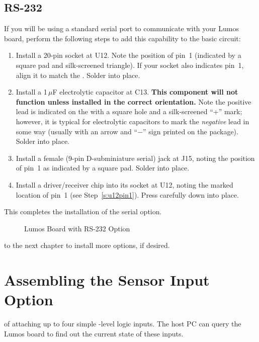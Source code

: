 \documentclass[letterpaper,twoside,onecolumn,openright,final]{memoir}
\begin{document}
\section{RS-232}
If you will be using a standard  serial port to communicate with your Lumos board,
perform the following steps to add this capability to the basic  circuit:
\begin{enumerate}
\item\label{s:u12pin1}
	Install a 20-pin  socket at U12.  Note the position of pin~1 (indicated
	by a square pad and silk-screened triangle).  If your socket also indicates pin~1, align
	it to match the . Solder into place.
\item	Install a 1\,$\mu$F electrolytic capacitor at C13. {\bfseries This component will not
	function unless installed in the correct orientation.}  Note the positive lead is indicated
	on the  with a square hole and a silk-screened ``+'' mark; however, it is typical
	for electrolytic capacitors to mark the \emph{negative} lead in some way (usually with an arrow
	and ``$-$'' sign printed on the package).  Solder into place.
\item	Install a female  (9-pin D-subminiature serial) jack at J15, 
	noting the position of pin~1 as indicated by a square pad.  Solder into place.
\item	Install a  driver/receiver chip into its socket at U12, noting the marked location
	of pin~1 (see Step~\ref{s:u12pin1}).  Press carefully down into place.
\end{enumerate}

This completes the installation of the  serial option.
\begin{figure}
 \centerfloat
 \caption{Lumos Board with RS-232 Option\label{fig:rs232-parts}}
\end{figure}

\bigskip{} to the next chapter to install more options, if desired.

\chapter{Assembling the Sensor Input Option}\label{ch:sensor-in}
 of attaching up to four simple -level
logic inputs.  The host PC can query the Lumos board to find out the current state of these
inputs.  %
\end{document}
